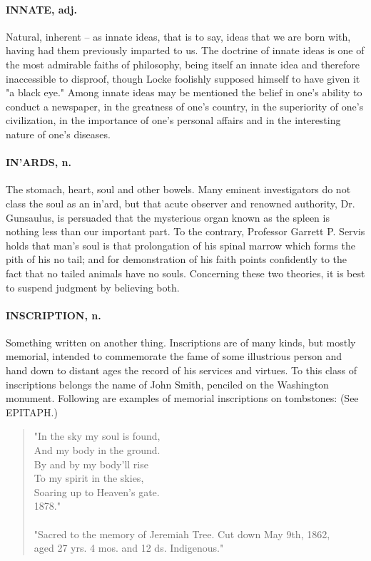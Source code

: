 \documentclass[11pt]{article}
\begin{document}
\paragraph{INNATE, adj.}  Natural, inherent -- as innate ideas, that is to say,
ideas that we are born with, having had them previously imparted to
us.  The doctrine of innate ideas is one of the most admirable faiths
of philosophy, being itself an innate idea and therefore inaccessible
to disproof, though Locke foolishly supposed himself to have given it
"a black eye."  Among innate ideas may be mentioned the belief in
one's ability to conduct a newspaper, in the greatness of one's
country, in the superiority of one's civilization, in the importance
of one's personal affairs and in the interesting nature of one's
diseases.

\paragraph{IN'ARDS, n.}  The stomach, heart, soul and other bowels.  Many eminent
investigators do not class the soul as an in'ard, but that acute
observer and renowned authority, Dr. Gunsaulus, is persuaded that the
mysterious organ known as the spleen is nothing less than our
important part.  To the contrary, Professor Garrett P. Servis holds
that man's soul is that prolongation of his spinal marrow which forms
the pith of his no tail; and for demonstration of his faith points
confidently to the fact that no tailed animals have no souls.
Concerning these two theories, it is best to suspend judgment by
believing both.

\paragraph{INSCRIPTION, n.}  Something written on another thing.  Inscriptions are
of many kinds, but mostly memorial, intended to commemorate the fame
of some illustrious person and hand down to distant ages the record of
his services and virtues.  To this class of inscriptions belongs the
name of John Smith, penciled on the Washington monument.  Following
are examples of memorial inscriptions on tombstones:  (See EPITAPH.)

\begin{quote}   "In the sky my soul is found, \\
  And my body in the ground. \\
  By and by my body'll rise \\
  To my spirit in the skies, \\
  Soaring up to Heaven's gate. \\
          1878." \\
 \\
  "Sacred to the memory of Jeremiah Tree.  Cut down May 9th, 1862, \\
aged 27 yrs. 4 mos. and 12 ds.  Indigenous." \end{quote}
\end{document}

